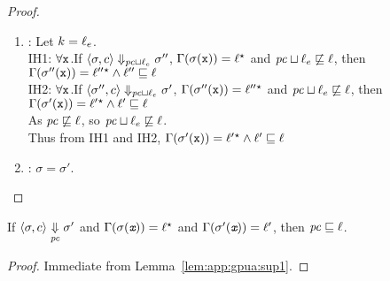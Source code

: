 \begin{proof}
\begin{enumerate}
\item {}: Let $k = \ell_e$. \\
 IH1: $\forall \texttt{x}$.If $\langle \sigma, c \rangle \Downarrow_{\mathit{pc} \sqcup \ell_e}
\sigma''$, $\Gamma(\sigma(\texttt{x})) =   \ell {}^\star
 $ and $\mathit{pc} \sqcup \ell_e \not\sqsubseteq \ell$, then $\Gamma(\sigma''(\texttt{x})) =
  \ell''{}^\star   \wedge \ell'' \sqsubseteq \ell$\\
IH2: $\forall \texttt{x}$.If $\langle \sigma'', c \rangle \Downarrow_{\mathit{pc} \sqcup \ell_e}
\sigma'$, $\Gamma(\sigma''(\texttt{x})) =   \ell'' {}^\star
 $ and $\mathit{pc} \sqcup \ell_e \not\sqsubseteq \ell$, then $\Gamma(\sigma'(\texttt{x})) =
  \ell' {}^\star   \wedge \ell' \sqsubseteq \ell$\\
 As $\mathit{pc} \not\sqsubseteq \ell$, so $\mathit{pc} \sqcup \ell_e \not\sqsubseteq
 \ell$. \\ Thus from IH1 and IH2, $\Gamma(\sigma'(\texttt{x})) =
  \ell' {}^\star   \wedge \ell' \sqsubseteq \ell$

\item {} : $\sigma = \sigma'$.
\end{enumerate}
\end{proof}

\begin{mycor}
\label{cor:app:gpua:cor1}
If $\langle \sigma, c \rangle \underset{\mathit{pc}}{\Downarrow} \sigma'$ and
$\Gamma(\sigma(\emph{\texttt{x}})) = \ell{}^\star $ and
$\Gamma(\sigma'(\emph{\texttt{x}})) = \ell'$, then 
$\mathit{pc} \sqsubseteq \ell$.
\end{mycor}
\begin{proof}
Immediate from Lemma~\ref{lem:app:gpua:sup1}.
\end{proof}

